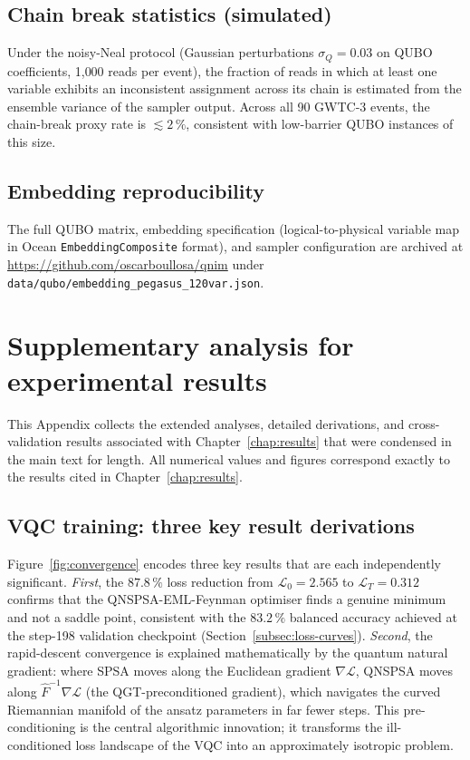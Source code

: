 \documentclass[11pt,a4paper, english]{book}
\theoremstyle{plain}
\theoremstyle{definition}
\numberwithin{equation}{chapter}
\numberwithin{figure}{chapter}
\numberwithin{table}{chapter}
\begin{document}
\section{Chain break statistics (simulated)}
Under the noisy-Neal protocol (Gaussian perturbations 
$\sigma_Q = 0.03$ on QUBO coefficients, 1{,}000 reads per event), 
the fraction of reads in which at least one variable exhibits 
an inconsistent assignment across its chain is estimated from the 
ensemble variance of the sampler output. Across all 90 GWTC-3 events, 
the chain-break proxy rate is $\lesssim 2\,\%$, consistent with 
low-barrier QUBO instances of this size.

\section{Embedding reproducibility}
The full QUBO matrix, embedding specification (logical-to-physical 
variable map in Ocean \texttt{EmbeddingComposite} format), and 
sampler configuration are archived at 
\url{https://github.com/oscarboullosa/qnim} under 
\texttt{data/qubo/embedding\_pegasus\_120var.json}.

\chapter{Supplementary analysis for experimental results}
\label{app:ch7-supplement}

This Appendix collects the extended analyses, detailed derivations, and
cross-validation results associated with Chapter~\ref{chap:results} that
were condensed in the main text for length.  All numerical values and
figures correspond exactly to the results cited in Chapter~\ref{chap:results}.

\section{VQC training: three key result derivations}
\label{app:ch7-training-detail}

Figure~\ref{fig:convergence} encodes three key results that are each
independently significant.  \emph{First}, the $87.8\,\%$ loss reduction
from $\mathcal{L}_0 = 2.565$ to $\mathcal{L}_T = 0.312$ confirms that
the QNSPSA-EML-Feynman optimiser finds a genuine minimum and not a
saddle point, consistent with the $83.2\,\%$ balanced accuracy achieved
at the step-198 validation checkpoint (Section~\ref{subsec:loss-curves}). \emph{Second}, the rapid-descent convergence
is explained mathematically by the quantum natural gradient: where
SPSA moves along the Euclidean gradient $\nabla\mathcal{L}$, QNSPSA moves
along $\hat{F}^{-1}\nabla\mathcal{L}$ (the QGT-preconditioned gradient),
which navigates the curved Riemannian manifold of the ansatz parameters
in far fewer steps.  This pre-conditioning is the central algorithmic
innovation; it transforms the ill-conditioned loss landscape of the VQC
into an approximately isotropic problem.
\end{document}

